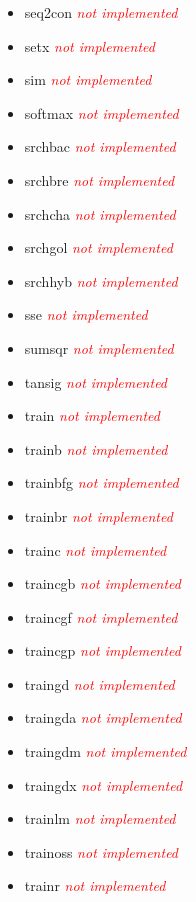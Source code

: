 \begin{itemize}
	\item seq2con \textcolor{red}{\textit{not implemented}}
	\item setx \textcolor{red}{\textit{not implemented}}
	\item sim \textcolor{red}{\textit{not implemented}}
	\item softmax \textcolor{red}{\textit{not implemented}}
	\item srchbac \textcolor{red}{\textit{not implemented}}
	\item srchbre \textcolor{red}{\textit{not implemented}}
	\item srchcha \textcolor{red}{\textit{not implemented}}
	\item srchgol \textcolor{red}{\textit{not implemented}}
	\item srchhyb \textcolor{red}{\textit{not implemented}}
	\item sse \textcolor{red}{\textit{not implemented}}
	\item sumsqr \textcolor{red}{\textit{not implemented}}
	\item tansig \textcolor{red}{\textit{not implemented}}
	\item train \textcolor{red}{\textit{not implemented}}
	\item trainb \textcolor{red}{\textit{not implemented}}
	\item trainbfg \textcolor{red}{\textit{not implemented}}
	\item trainbr \textcolor{red}{\textit{not implemented}}
	\item trainc \textcolor{red}{\textit{not implemented}}
	\item traincgb \textcolor{red}{\textit{not implemented}}
	\item traincgf \textcolor{red}{\textit{not implemented}}
	\item traincgp \textcolor{red}{\textit{not implemented}}
	\item traingd \textcolor{red}{\textit{not implemented}}
	\item traingda \textcolor{red}{\textit{not implemented}}
	\item traingdm \textcolor{red}{\textit{not implemented}}
	\item traingdx \textcolor{red}{\textit{not implemented}} 
	\item trainlm \textcolor{red}{\textit{not implemented}}
	\item trainoss \textcolor{red}{\textit{not implemented}}
	\item trainr \textcolor{red}{\textit{not implemented}}

\end{itemize}
